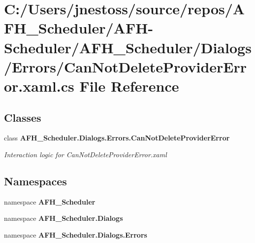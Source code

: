 \section{C\+:/\+Users/jnestoss/source/repos/\+A\+F\+H\+\_\+\+Scheduler/\+A\+F\+H-\/\+Scheduler/\+A\+F\+H\+\_\+\+Scheduler/\+Dialogs/\+Errors/\+Can\+Not\+Delete\+Provider\+Error.xaml.\+cs File Reference}
\label{_can_not_delete_provider_error_8xaml_8cs}
\subsection*{Classes}
\begin{DoxyCompactItemize}
\item 
class \textbf{ A\+F\+H\+\_\+\+Scheduler.\+Dialogs.\+Errors.\+Can\+Not\+Delete\+Provider\+Error}
\begin{DoxyCompactList}\small\item\em Interaction logic for Can\+Not\+Delete\+Provider\+Error.\+xaml \end{DoxyCompactList}\end{DoxyCompactItemize}
\subsection*{Namespaces}
\begin{DoxyCompactItemize}
\item 
namespace \textbf{ A\+F\+H\+\_\+\+Scheduler}
\item 
namespace \textbf{ A\+F\+H\+\_\+\+Scheduler.\+Dialogs}
\item 
namespace \textbf{ A\+F\+H\+\_\+\+Scheduler.\+Dialogs.\+Errors}
\end{DoxyCompactItemize}
